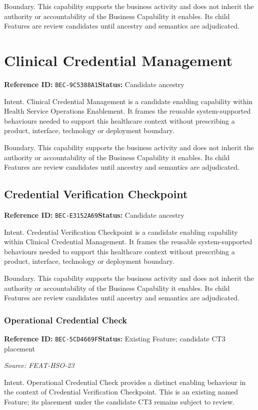 \documentclass[11pt,a4paper,openany]{book}
\begin{document}
Boundary. This capability supports the business activity and does not inherit the authority or accountability of the Business Capability it enables. Its child Features are review candidates until ancestry and semantics are adjudicated.

\section{Clinical Credential Management}\label{cap:bec-9c5388a1}
\noindent\textbf{Reference ID:} \texttt{BEC-9C5388A1}\quad \textbf{Status:} Candidate ancestry\par
Intent. Clinical Credential Management is a candidate enabling capability within Health Service Operations Enablement. It frames the reusable system-supported behaviours needed to support this healthcare context without prescribing a product, interface, technology or deployment boundary.

Boundary. This capability supports the business activity and does not inherit the authority or accountability of the Business Capability it enables. Its child Features are review candidates until ancestry and semantics are adjudicated.

\subsection{Credential Verification Checkpoint}\label{cap:bec-e3152a69}
\noindent\textbf{Reference ID:} \texttt{BEC-E3152A69}\quad \textbf{Status:} Candidate ancestry\par
Intent. Credential Verification Checkpoint is a candidate enabling capability within Clinical Credential Management. It frames the reusable system-supported behaviours needed to support this healthcare context without prescribing a product, interface, technology or deployment boundary.

Boundary. This capability supports the business activity and does not inherit the authority or accountability of the Business Capability it enables. Its child Features are review candidates until ancestry and semantics are adjudicated.

\subsubsection{Operational Credential Check}\label{cap:bec-5cd4669f}
\noindent\textbf{Reference ID:} \texttt{BEC-5CD4669F}\quad \textbf{Status:} Existing Feature; candidate CT3 placement\par
\noindent\textit{Source: FEAT-HSO-23}\par
Intent. Operational Credential Check provides a distinct enabling behaviour in the context of Credential Verification Checkpoint. This is an existing named Feature; its placement under the candidate CT3 remains subject to review.
\end{document}
